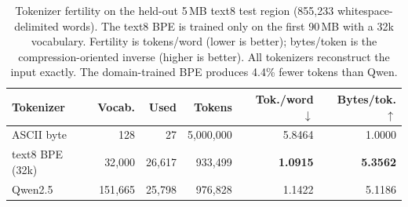 \begin{table}[t]
  \centering
  \small
  \caption{Tokenizer fertility on the held-out 5\,MB text8 test region
  (855{,}233 whitespace-delimited words). The text8 BPE is trained only on the
  first 90\,MB with a 32k vocabulary. Fertility is tokens/word (lower is
  better); bytes/token is the compression-oriented inverse (higher is
  better). All tokenizers reconstruct the input exactly. The domain-trained BPE
  produces 4.4\% fewer tokens than Qwen.}
  \label{tab:tokenizer-fertility}
  \begin{tabular}{@{}lrrrrr@{}}
    \toprule
    Tokenizer & Vocab. & Used & Tokens & Tok./word $\downarrow$ & Bytes/tok. $\uparrow$ \\
    \midrule
    ASCII byte & 128 & 27 & 5{,}000{,}000 & 5.8464 & 1.0000 \\
    text8 BPE (32k) & 32{,}000 & 26{,}617 & 933{,}499 & \textbf{1.0915} & \textbf{5.3562} \\
    Qwen2.5 & 151{,}665 & 25{,}798 & 976{,}828 & 1.1422 & 5.1186 \\
    \bottomrule
  \end{tabular}
\end{table}
